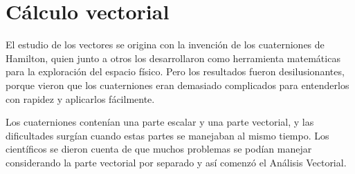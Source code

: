 \chapter{Cálculo vectorial}
\setlength{\parindent}{0cm}

\vspace{1cm}



\textcolor{gris}{ El estudio de los vectores se origina con la invención de los cuaterniones de Hamilton, quien junto a otros los desarrollaron como herramienta matemáticas para la exploración del espacio físico. Pero los resultados fueron desilusionantes, porque vieron que los cuaterniones eran demasiado complicados para entenderlos con rapidez y aplicarlos fácilmente.}

\textcolor{gris}{ Los cuaterniones contenían una parte escalar y una parte vectorial, y las dificultades surgían cuando estas partes se manejaban al mismo tiempo. Los científicos se dieron cuenta de que muchos problemas se podían manejar considerando la parte vectorial por separado y así comenzó el Análisis Vectorial.}

